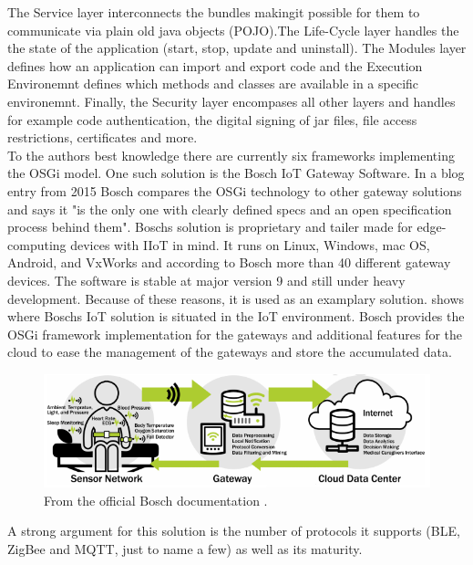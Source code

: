 The Service layer interconnects the bundles makingit possible for them to communicate via plain old java objects (POJO).The Life-Cycle layer handles the the state of the application (start, stop, update and uninstall). The Modules layer defines how an application can import and export code and the Execution Environemnt defines which methods and classes are available in a specific environemnt. Finally, the Security layer encompases all other layers and handles for example code authentication, the digital signing of jar files, file access restrictions, certificates and more.\\
To the authors best knowledge there are currently six frameworks implementing the OSGi model. One such solution is the Bosch IoT Gateway Software\cite{BoschIoT13:online}. In a blog entry from 2015 Bosch compares the OSGi technology to other gateway solutions and says it "is the only one with clearly defined specs and an open specification process behind them"\cite{boschBlogOSGi69:online}. Boschs solution is proprietary and tailer made for edge-computing devices with IIoT in mind\cite{OSGiforIoTBlog27:online}. It runs on Linux, Windows, mac OS, Android, and VxWorks and according to Bosch more than 40 different gateway devices\cite{BoschIoT13:online}. The software is stable at major version 9 and still under heavy development. Because of these reasons, it is used as an examplary solution.  shows where Boschs IoT solution is situated in the IoT environment. Bosch provides the OSGi framework implementation for the gateways and additional features for the cloud to ease the management of the gateways and store the accumulated data.
\begin{figure}[h!]
    \centering
    \includegraphics[scale=0.8]{figures/iotSetup.png}
    \caption{From the official Bosch documentation \cite{BoschIoT13:online}.}
    \label{fig:boschIoTGatewaySetup}
\end{figure}
A strong argument for this solution is the number of protocols it supports (BLE, ZigBee and MQTT, just to name a few) as well as its maturity.




